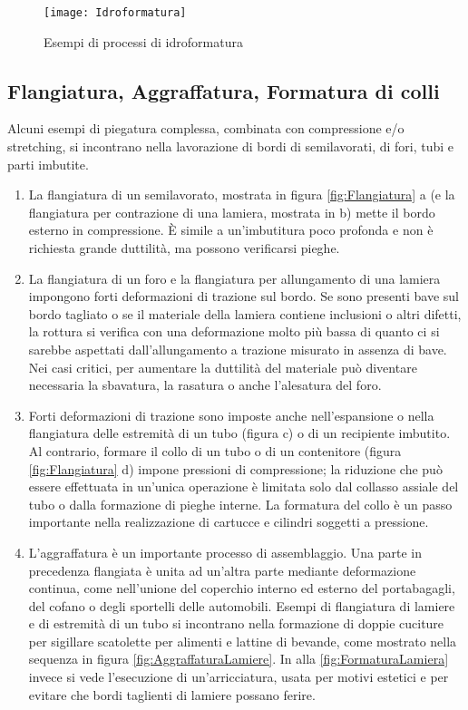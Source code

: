 \begin{figure}
\centering
\texttt{[image: Idroformatura]}
\caption{Esempi di processi di idroformatura}
\label{fig:Idroformatura}
\end{figure}

\subsection{Flangiatura, Aggraffatura, Formatura di colli}
Alcuni esempi di piegatura complessa, combinata con compressione e/o stretching, si incontrano nella lavorazione di bordi di semilavorati, di fori, tubi e parti imbutite.

\begin{enumerate}
\item La flangiatura di un semilavorato, mostrata in figura \ref{fig:Flangiatura} a (e la flangiatura per contrazione di una lamiera, mostrata in b) mette il bordo esterno in compressione. È simile a un'imbutitura poco profonda e non è richiesta grande duttilità, ma possono verificarsi pieghe.
\item La flangiatura di un foro e la flangiatura per allungamento di una lamiera impongono forti deformazioni di trazione sul bordo.
Se sono presenti bave sul bordo tagliato o se il materiale della lamiera contiene inclusioni o altri difetti, la rottura si verifica con una deformazione molto più bassa di quanto ci si sarebbe aspettati dall'allungamento a trazione misurato in assenza di bave.
Nei casi critici, per aumentare la duttilità del materiale può diventare necessaria la
sbavatura, la rasatura o anche l'alesatura del foro.
\item Forti deformazioni di trazione sono imposte anche nell'espansione o nella flangiatura delle
estremità di un tubo (figura c) o di un recipiente imbutito.
Al contrario, formare il collo di un tubo o di un contenitore (figura \ref{fig:Flangiatura} d) impone pressioni di compressione; la riduzione che può essere effettuata in un'unica operazione è limitata solo dal collasso assiale del tubo o dalla formazione di pieghe interne.
La formatura del collo è un passo importante nella realizzazione di cartucce e cilindri
soggetti a pressione.
\item L'aggraffatura è un importante processo di assemblaggio. Una parte in precedenza flangiata è unita ad un'altra parte mediante deformazione continua, come nell'unione del coperchio interno ed esterno del portabagagli, del cofano o degli sportelli delle automobili.
Esempi di flangiatura di lamiere e di estremità di un tubo si incontrano nella formazione di
doppie cuciture per sigillare scatolette per alimenti e lattine di bevande, come mostrato nella
sequenza in figura \ref{fig:AggraffaturaLamiere}. In alla \ref{fig:FormaturaLamiera} invece si vede l'esecuzione di un'arricciatura, usata per motivi
estetici e per evitare che bordi taglienti di lamiere possano ferire.
\end{enumerate}

